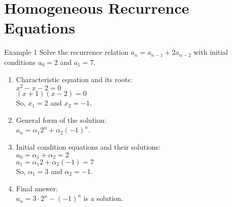 \documentclass{beamer}
\begin{document}
\section{Homogeneous Recurrence Equations}

\begin{frame}{Example 1}
    Solve the recurrence relation $a_n = a_{n-1} + 2 a_{n-2}$ with initial conditions $a_0 = 2$ and $a_1 = 7$.
    \footnotesize
    \begin{enumerate}[<+->]
        \item Characteristic equation and its roots: \\
        $ x^2 - x - 2 = 0 $ \\
        $ (x + 1)(x - 2) = 0 $ \\
        So, $x_1 = 2$ and $x_2 = -1$.
        \item General form of the solution: \\
        $ a_n = \alpha_1 2^n + \alpha_2 (-1)^n $.
        \item Initial condition equations and their solutions: \\
        $ a_0 = \alpha_1 + \alpha_2 = 2 $ \\
        $ a_1 = \alpha_1 2 + \alpha_2 (-1) = 7 $ \\
        So, $\alpha_1 = 3$ and $\alpha_2 = -1$.
        \item Final answer: \\
        $ a_n = 3 \cdot 2^n - (-1)^n $ is a solution.
    \end{enumerate}
\end{frame}
\end{document}
